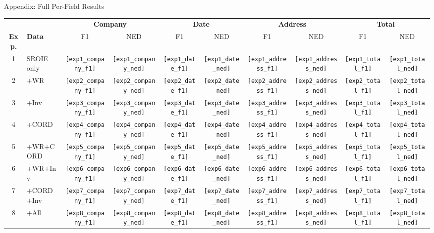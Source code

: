 \documentclass[aspectratio=169,11pt]{beamer}
\newcommand{\VAR}[1]{\texttt{[#1]}\xspace}
\begin{document}
\appendix

\begin{frame}[noframenumbering]{Appendix: Full Per-Field Results}
  \centering
  {\tiny
  \begin{tabular}{@{}clcccccccc@{}}
    \toprule
    & &
    \multicolumn{2}{c}{\textbf{Company}} &
    \multicolumn{2}{c}{\textbf{Date}} &
    \multicolumn{2}{c}{\textbf{Address}} &
    \multicolumn{2}{c}{\textbf{Total}} \\
    \cmidrule(lr){3-4}\cmidrule(lr){5-6}\cmidrule(lr){7-8}\cmidrule(lr){9-10}
    \textbf{Exp.} & \textbf{Data} & F1 & NED & F1 & NED & F1 & NED & F1 & NED \\
    \midrule
    1 & SROIE only     & \VAR{exp1_company_f1} & \VAR{exp1_company_ned} & \VAR{exp1_date_f1} & \VAR{exp1_date_ned} & \VAR{exp1_address_f1} & \VAR{exp1_address_ned} & \VAR{exp1_total_f1} & \VAR{exp1_total_ned} \\
    2 & +WR            & \VAR{exp2_company_f1} & \VAR{exp2_company_ned} & \VAR{exp2_date_f1} & \VAR{exp2_date_ned} & \VAR{exp2_address_f1} & \VAR{exp2_address_ned} & \VAR{exp2_total_f1} & \VAR{exp2_total_ned} \\
    3 & +Inv           & \VAR{exp3_company_f1} & \VAR{exp3_company_ned} & \VAR{exp3_date_f1} & \VAR{exp3_date_ned} & \VAR{exp3_address_f1} & \VAR{exp3_address_ned} & \VAR{exp3_total_f1} & \VAR{exp3_total_ned} \\
    4 & +CORD          & \VAR{exp4_company_f1} & \VAR{exp4_company_ned} & \VAR{exp4_date_f1} & \VAR{exp4_date_ned} & \VAR{exp4_address_f1} & \VAR{exp4_address_ned} & \VAR{exp4_total_f1} & \VAR{exp4_total_ned} \\
    5 & +WR+CORD       & \VAR{exp5_company_f1} & \VAR{exp5_company_ned} & \VAR{exp5_date_f1} & \VAR{exp5_date_ned} & \VAR{exp5_address_f1} & \VAR{exp5_address_ned} & \VAR{exp5_total_f1} & \VAR{exp5_total_ned} \\
    6 & +WR+Inv        & \VAR{exp6_company_f1} & \VAR{exp6_company_ned} & \VAR{exp6_date_f1} & \VAR{exp6_date_ned} & \VAR{exp6_address_f1} & \VAR{exp6_address_ned} & \VAR{exp6_total_f1} & \VAR{exp6_total_ned} \\
    7 & +CORD+Inv      & \VAR{exp7_company_f1} & \VAR{exp7_company_ned} & \VAR{exp7_date_f1} & \VAR{exp7_date_ned} & \VAR{exp7_address_f1} & \VAR{exp7_address_ned} & \VAR{exp7_total_f1} & \VAR{exp7_total_ned} \\
    8 & +All           & \VAR{exp8_company_f1} & \VAR{exp8_company_ned} & \VAR{exp8_date_f1} & \VAR{exp8_date_ned} & \VAR{exp8_address_f1} & \VAR{exp8_address_ned} & \VAR{exp8_total_f1} & \VAR{exp8_total_ned} \\
    \bottomrule
  \end{tabular}
  }
\end{frame}
\end{document}
